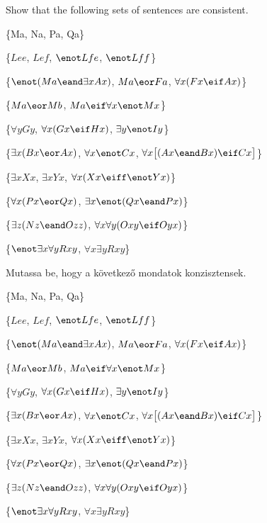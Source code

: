 \problempart
Show that the following sets of sentences are consistent.
\begin{earg}
\item \{Ma, \enot Na, Pa, \enot Qa\}
\item \{$Lee$, $Lef$, $\enot Lfe$, $\enot Lff$\}
\item \{$\enot (Ma \eand \exists x Ax)$, $Ma \eor Fa$, $\forall x(Fx \eif Ax)$\}
\item \{$Ma \eor Mb$, $Ma \eif \forall x \enot Mx$\}
\item \{$\forall y Gy$, $\forall x (Gx \eif Hx)$, $\exists y \enot Iy$\}
\item \{$\exists x(Bx \eor Ax)$, $\forall x \enot Cx$, $\forall x\bigl[(Ax \eand Bx) \eif Cx\bigr]$\}
\item \{$\exists x Xx$, $\exists x Yx$, $\forall x(Xx \eiff \enot Yx)$\}
\item \{$\forall x(Px \eor Qx)$, $\exists x\enot(Qx \eand Px)$\}
\item \{$\exists z(Nz \eand Ozz)$, $\forall x\forall y(Oxy \eif Oyx)$\}
\item \{$\enot \exists x \forall y Rxy$, $\forall x \exists y Rxy$\}
\end{earg}
\problempart
Mutassa be, hogy a következő mondatok konzisztensek.
\begin{earg}
\item \{Ma, \enot Na, Pa, \enot Qa\}
\item \{$Lee$, $Lef$, $\enot Lfe$, $\enot Lff$\}
\item \{$\enot (Ma \eand \exists x Ax)$, $Ma \eor Fa$, $\forall x(Fx \eif Ax)$\}
\item \{$Ma \eor Mb$, $Ma \eif \forall x \enot Mx$\}
\item \{$\forall y Gy$, $\forall x (Gx \eif Hx)$, $\exists y \enot Iy$\}
\item \{$\exists x(Bx \eor Ax)$, $\forall x \enot Cx$, $\forall x\bigl[(Ax \eand Bx) \eif Cx\bigr]$\}
\item \{$\exists x Xx$, $\exists x Yx$, $\forall x(Xx \eiff \enot Yx)$\}
\item \{$\forall x(Px \eor Qx)$, $\exists x\enot(Qx \eand Px)$\}
\item \{$\exists z(Nz \eand Ozz)$, $\forall x\forall y(Oxy \eif Oyx)$\}
\item \{$\enot \exists x \forall y Rxy$, $\forall x \exists y Rxy$\}
\end{earg}


